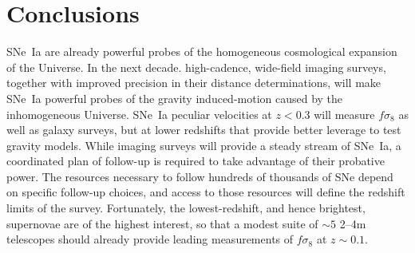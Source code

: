 \documentclass{aastex62}   	%
\begin{document}
\section{Conclusions}
SNe~Ia are already powerful probes of the homogeneous cosmological expansion of the Universe.  In the next decade.
high-cadence, wide-field imaging surveys, together with improved precision in their distance determinations, will make SNe~Ia powerful probes
of the gravity induced-motion caused by the inhomogeneous Universe.  SNe~Ia peculiar velocities at $z<0.3$ will measure $f \sigma_8$ as well
as galaxy surveys, but at lower redshifts that provide better leverage to test gravity models.
While imaging surveys will provide a steady stream of SNe~Ia, a coordinated plan of follow-up is required to take advantage of
their probative power.  The resources necessary to follow hundreds of thousands of SNe depend on specific follow-up choices, and 
access to those resources will define the redshift limits of the survey.  Fortunately, the lowest-redshift, and hence brightest, supernovae
are of the highest interest, so that a modest suite of $\sim 5$ 2--4m telescopes should already provide leading measurements of
$f\sigma_8$ at $z\sim 0.1$.
\end{document}

